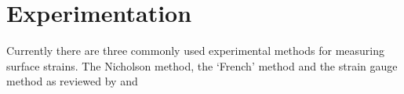 \section{Experimentation}
Currently there are three commonly used experimental methods for measuring
surface strains. The Nicholson method, the `French' method and the strain
gauge method as reviewed by \cite{Murphy_2005} and \cite{yang2005measurement}